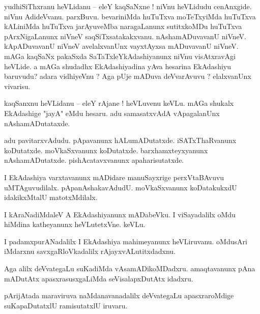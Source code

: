\documentclass{article}
\begin{document}
\begin{mn}%
yudhiSiThxranu heVLidanu -- eleY kaqSaNxne ! niVnu heVLidudu cenAnxgide. niVnu AdideVvanu. 
parxBuvu. bevariniMda huTuTxva moTeTxyiMda huTuTxva kALiniMda huTuTxva jarAyuveMba naragaLanunx 
sutitxkoMDu huTuTxva pArxNigaLanunx niVneV saqSiTxsatakakxvanu. nAshamADuvavanU niVneV. 
kApADuvavanU niVneV avelalxvanUnx vayxtAyxsa mADuvavanU niVneV. mAGa kaqSaNx pakaSxda 
SaTaTxleYkAdashiyanunx niVnu visAtxravAgi heVLide. a mAGa shudadhx EkAdashiyadina yAva hesarina 
EkAdashiyu baruvudu? adara vidhiyeVnu ? Aga pUje mADuva deVvarAvuvu ? elalxvanUnx vivarisu.
\end{mn}

\begin{mn}%
kaqSanxnu heVLidanu -- eleY rAjane ! heVLuvenu keVLu. mAGa shukalx EkAdashige "jayA" eMdu hesaru. 
adu samasatxvAdA vApagalanUnx nAshamADutataxde.
\end{mn}

\begin{mn}%
adu pavitarxvAdudu. pApavanunx hALumADutatxde. iSATxThaRvanunx koDutatxde. moVkaSxvanunx 
koDutatxde. barxhamxteyxyanunx nAshamADutatxde. pishAcatavxvanunx apaharisutatxde.
\end{mn}

\begin{mn}%
I EkAdashiya varxtavanunx mADidare manuSayxrige perxVtaBAvuvu uMTAguvudilalx. pApanAshakavAdudU. 
moVkaSxvanunx koDatakukxdU idakikxMtalU matotxMdilalx.
\end{mn}

\begin{mn}%
I kAraNadiMdaleV A EkAdashiyanunx mADabeVku. I viSayadalilx oMdu hiMdina katheyanunx heVLutetxVne. 
keVLu.
\end{mn}

\begin{mn}%
I padamxpurANadalilx I EkAdashiya mahimeyanunx heVLiruvanu. oMdusAri iMdarxnu savxgaRloVkadalilx 
rAjayxvALutitxdadxnu.
\end{mn}

\begin{mn}%
Aga alilx deVvategaLu suKadiMda vAsamADikoMDadxru. amaqtavanunx pAna mADutAtx apasxrasusxgaLiMda 
seVisalapxDutAtx idadxru.
\end{mn}

\begin{mn}%
pArijAtada maraviruva naMdanavanadalilx deVvategaLu apasxraroMdige suKapaDutatxlU ramisutatxlU 
iruvaru.
\end{mn}
\end{document}
